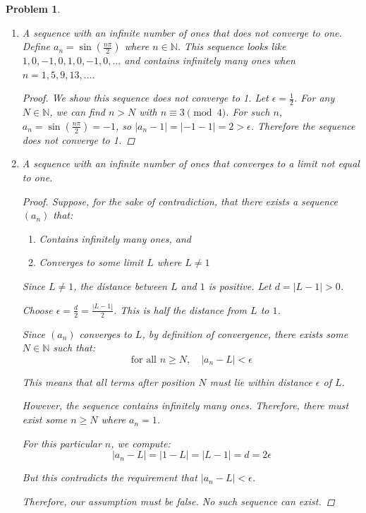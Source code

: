 \documentclass[12pt]{article}
\newtheorem{problem}{Problem}
\newcommand{\NN}{\ensuremath{\mathbb N}}
\newcommand{\eps}{\ensuremath{\epsilon}}
\begin{document}
\begin{problem} %
\begin{enumerate}
\item A sequence with an infinite number of ones that does not converge to one.
	\newline\newline
	Define $a_n = \sin( \frac{n \pi}{2})$ where $n \in \NN$. This sequence looks like $1, 0, -1, 0, 1, 0, -1, 0, \dots$ and contains infinitely many ones when $n = 1, 5, 9, 13, \dots$.
\begin{proof}
We show this sequence does not converge to 1. Let $\eps = \frac{1}{2}$. For any $N \in \mathbb{N}$, we can find $n > N$ with $n \equiv 3 \pmod{4}$. For such $n$, $a_n = \sin\left(\frac{n\pi}{2}\right) = -1$, so $|a_n - 1| = |-1 - 1| = 2 > \eps$. Therefore the sequence does not converge to 1.
\end{proof}
	\bigskip
\item A sequence with an infinite number of ones that converges to a limit not equal to one.

\begin{proof}
Suppose, for the sake of contradiction, that there exists a sequence $(a_n)$ that:
\begin{enumerate}
\item Contains infinitely many ones, and
\item Converges to some limit $L$ where $L \neq 1$
\end{enumerate}

Since $L \neq 1$, the distance between $L$ and $1$ is positive. Let $d = |L - 1| > 0$.

Choose $\eps = \frac{d}{2} = \frac{|L-1|}{2}$. This is half the distance from $L$ to $1$.

Since $(a_n)$ converges to $L$, by definition of convergence, there exists some $N \in \mathbb{N}$ such that:
$$\text{for all } n \geq N, \quad |a_n - L| < \eps$$

This means that all terms after position $N$ must lie within distance $\eps$ of $L$.

However, the sequence contains infinitely many ones. Therefore, there must exist some $n \geq N$ where $a_n = 1$.

For this particular $n$, we compute:
$$|a_n - L| = |1 - L| = |L - 1| = d = 2\eps$$

But this contradicts the requirement that $|a_n - L| < \eps$.

Therefore, our assumption must be false. No such sequence can exist.
\end{proof}
\bigskip
\end{enumerate}
\end{problem}
\end{document}
